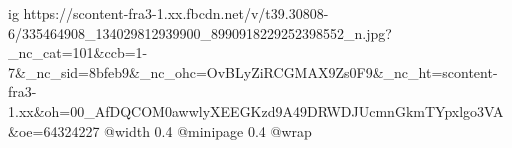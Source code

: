  
 
 
 
 

\ifcmt
  ig https://scontent-fra3-1.xx.fbcdn.net/v/t39.30808-6/335464908_134029812939900_8990918229252398552_n.jpg?_nc_cat=101&ccb=1-7&_nc_sid=8bfeb9&_nc_ohc=OvBLyZiRCGMAX9Zs0F9&_nc_ht=scontent-fra3-1.xx&oh=00_AfDQCOM0awwlyXEEGKzd9A49DRWDJUcmnGkmTYpxlgo3VA&oe=64324227
  @width 0.4
  @minipage 0.4
  @wrap \parpic[r]
\fi

